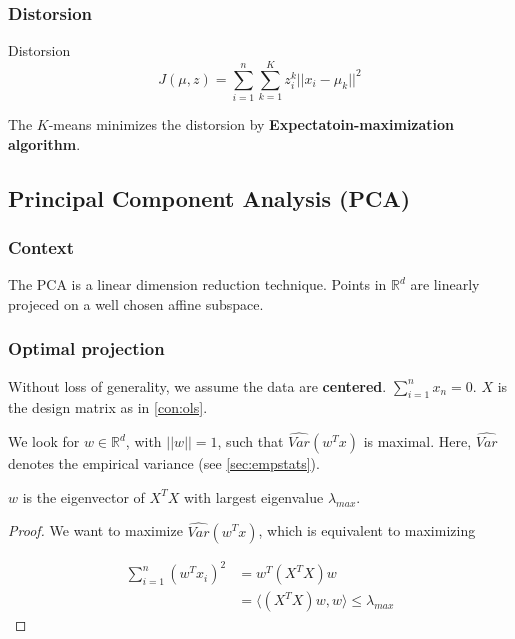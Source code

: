 \documentclass[
10pt, %
a4paper, %
oneside, %
headinclude,footinclude, %
BCOR5mm, %
]{scrartcl}
\begin{document}
\subsubsection{\large\color{Periwinkle}Distorsion}

\begin{definition}{Distorsion}
    \begin{equation*}
    J(\mu, z) = \sum^{n}_{i=1} \sum^{K}_{k=1} z_i^k||x_i-\mu_k||^2
    \end{equation*}
\end{definition}

The $K$-means minimizes the distorsion by \textbf{{Expectatoin-maximization algorithm}}.

\subsection{\large\color{MidnightBlue}Principal Component Analysis (PCA)}

\subsubsection{\large\color{Periwinkle}Context}

The PCA is a linear dimension reduction technique. Points in $ \mathbb{R}^d$ are linearly projeced on a well chosen affine subspace.

\subsubsection{\large\color{Periwinkle}Optimal projection}

Without loss of generality, we assume the data are \textbf{{centered}}. $ \sum^{n}_{i=1} x_n=0$. $X$ is the design matrix as in \ref{con:ols}.

We look for $w\in \mathbb{R}^d$, with $||w||=1$, such that $ \hat{Var}(w^Tx)$ is maximal. Here, $ \hat{Var}$ denotes the empirical variance (see \ref{sec:empstats}).

\begin{proposition}

    $w$ is the eigenvector of $X^TX$ with largest eigenvalue $\lambda_{max}$.
\end{proposition}

\begin{proof}
    We want to maximize $ \hat{Var}(w^Tx)$, which is equivalent to maximizing

    \begin{equation*}
        \begin{aligned}
	    \sum^{n}_{i=1} (w^Tx_i)^2 &=  w^T(X^TX)w\\
	    &= \langle (X^TX)w, w \rangle
	    \leq \lambda_{max}
        \end{aligned}
    \end{equation*}

\end{proof}
\end{document}
